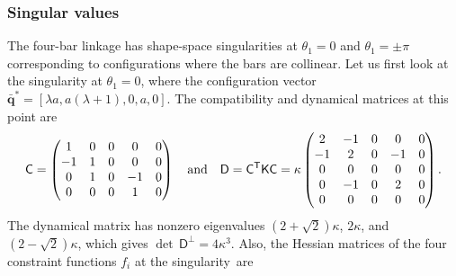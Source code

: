 \subsubsection*{Singular values}

The four-bar linkage has shape-space singularities at $\theta_1 = 0$ and $\theta_1 = \pm\pi$ corresponding to configurations where the bars are collinear.
Let us first look at the singularity at $\theta_1 = 0$, where the configuration vector $\bar{\bm{q}}^{*} = [\lambda a, a(\lambda + 1), 0, a, 0]$.
The compatibility and dynamical matrices at this point are
%
\begin{equation}
  \mathsf{C} =
  \begin{pmatrix}
  1  & 0 & 0 & 0  & 0 \\
  -1 & 1 & 0 & 0  & 0 \\
  0  & 1 & 0 & -1 & 0 \\
  0  & 0 & 0 & 1  & 0 \\
  \end{pmatrix}
  \quad\text{and}\quad
  \mathsf{D} = \mathsf{C}^\mathsf{T}\mathsf{K}\mathsf{C} = \kappa
  \begin{pmatrix}
    2  & -1 & 0 & 0  & 0 \\
    -1 & 2  & 0 & -1 & 0 \\
    0  & 0  & 0 & 0  & 0 \\
    0  & -1 & 0 & 2  & 0 \\
    0  & 0  & 0 & 0  & 0 \\
  \end{pmatrix}.
\end{equation}
%
The dynamical matrix has nonzero eigenvalues $(2+\sqrt{2})\kappa$, $2\kappa$, and $(2-\sqrt{2})\kappa$, which gives $\det\,\mathsf{D}^\perp = 4\kappa^3$.
Also, the Hessian matrices of the four constraint functions $f_i$ at the singularity~are

